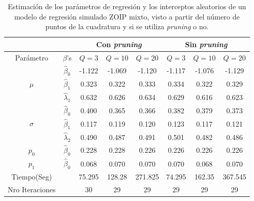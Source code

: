 \begin{table}[!hbt]
{\scriptsize
\begin{center}
\begin{tabular}{|c|c|c|c|c|c|c|c|}\hline
& & \multicolumn{3}{|c|}{Con \textit{pruning}} & \multicolumn{3}{|c|}{Sin \textit{pruning}} \\ \hline
Par\'{a}metro & $\beta$'s & $Q=3$ & $Q=10$ & $Q=20$ & $Q=3$ & $Q=10$ & $Q=20$ \\ \hline \hline
\multirow{3}{*}{$\mu$} & $\hat{\beta}_0$ & -1.122	& -1.069	& -1.120	& -1.117	& -1.076	& -1.129 \\ 
& $\hat{\beta}_1$ & 0.323	&0.322	&0.333	&0.334	&0.322	&0.329 \\
& $\hat{\lambda}_1$ & 0.632	&0.626	&0.634	&0.629	&0.616	&0.623 \\ \hline
\multirow{3}{*}{$\sigma$} & $\hat{\beta}_0$ & 0.400	&0.365	&0.366	&0.382	&0.379	&0.373 \\ 
& $\hat{\beta}_1$ & 0.117	&0.119	&0.120	&0.123	&0.117	&0.121 \\
& $\hat{\lambda}_2$ & 0.490	&0.487	&0.491	&0.501	&0.482	&0.486 \\ \hline
$p_0$& $\hat{\beta}_0$ &0.228	&0.228	&0.226	&0.226	&0.226	&0.226 \\ \hline
$p_1$& $\hat{\beta}_0$ &0.068	&0.070	&0.070	&0.070	&0.068	&0.070 \\ \hline
Tiempo(Seg)& &75.295	&128.28	&271.825	&74.295	&162.35	&367.545 \\ \hline
Nro Iteraciones& &30	&29	&29	&29	&29	&29 \\ \hline
\end{tabular}
\caption{Estimaci\'{o}n de los par\'{a}metros de regresi\'{o}n y los interceptos aleatorios de un modelo de regresi\'{o}n simulado ZOIP mixto, visto a partir del n\'{u}mero de puntos de la cuadratura y si se utiliza \textit{pruning} o no.}
\label{T_Sim_mix_ncua}
\end{center}
}
\end{table}

